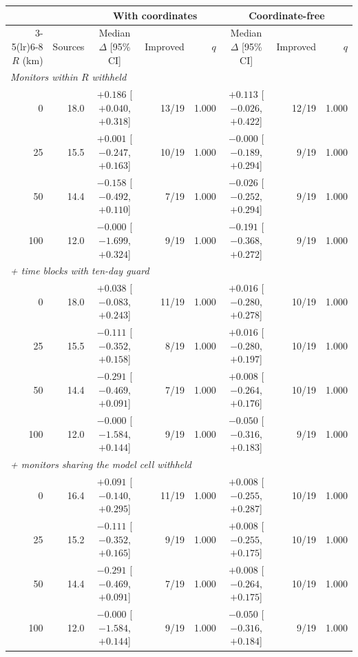 \begin{tabular}{rrcrrcrr}\toprule
& & \multicolumn{3}{c}{With coordinates} & \multicolumn{3}{c}{Coordinate-free} \\ \cmidrule(lr){3-5}\cmidrule(lr){6-8}
$R$ (km) & Sources & Median $\Delta$ [95\% CI] & Improved & $q$ & Median $\Delta$ [95\% CI] & Improved & $q$ \\ \midrule
\multicolumn{8}{l}{\emph{Monitors within $R$ withheld}} \\
0 & 18.0 & $+0.186$ [$+0.040$, $+0.318$] & 13/19 & 1.000 & $+0.113$ [$-0.026$, $+0.422$] & 12/19 & 1.000 \\
25 & 15.5 & $+0.001$ [$-0.247$, $+0.163$] & 10/19 & 1.000 & $-0.000$ [$-0.189$, $+0.294$] & 9/19 & 1.000 \\
50 & 14.4 & $-0.158$ [$-0.492$, $+0.110$] & 7/19 & 1.000 & $-0.026$ [$-0.252$, $+0.294$] & 9/19 & 1.000 \\
100 & 12.0 & $-0.000$ [$-1.699$, $+0.324$] & 9/19 & 1.000 & $-0.191$ [$-0.368$, $+0.272$] & 9/19 & 1.000 \\
\multicolumn{8}{l}{\emph{+ time blocks with ten-day guard}} \\
0 & 18.0 & $+0.038$ [$-0.083$, $+0.243$] & 11/19 & 1.000 & $+0.016$ [$-0.280$, $+0.278$] & 10/19 & 1.000 \\
25 & 15.5 & $-0.111$ [$-0.352$, $+0.158$] & 8/19 & 1.000 & $+0.016$ [$-0.280$, $+0.197$] & 10/19 & 1.000 \\
50 & 14.4 & $-0.291$ [$-0.469$, $+0.091$] & 7/19 & 1.000 & $+0.008$ [$-0.264$, $+0.176$] & 10/19 & 1.000 \\
100 & 12.0 & $-0.000$ [$-1.584$, $+0.144$] & 9/19 & 1.000 & $-0.050$ [$-0.316$, $+0.183$] & 9/19 & 1.000 \\
\multicolumn{8}{l}{\emph{+ monitors sharing the model cell withheld}} \\
0 & 16.4 & $+0.091$ [$-0.140$, $+0.295$] & 11/19 & 1.000 & $+0.008$ [$-0.255$, $+0.287$] & 10/19 & 1.000 \\
25 & 15.2 & $-0.111$ [$-0.352$, $+0.165$] & 9/19 & 1.000 & $+0.008$ [$-0.255$, $+0.175$] & 10/19 & 1.000 \\
50 & 14.4 & $-0.291$ [$-0.469$, $+0.091$] & 7/19 & 1.000 & $+0.008$ [$-0.264$, $+0.175$] & 10/19 & 1.000 \\
100 & 12.0 & $-0.000$ [$-1.584$, $+0.144$] & 9/19 & 1.000 & $-0.050$ [$-0.316$, $+0.184$] & 9/19 & 1.000 \\
\bottomrule\end{tabular}
